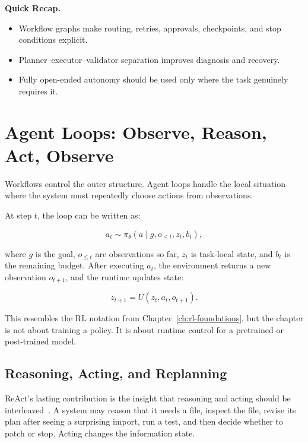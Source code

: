 \begin{quickrecap}
\textbf{Quick Recap.}
\begin{itemize}[nosep,leftmargin=1.5em]
  \item Workflow graphs make routing, retries, approvals, checkpoints, and stop conditions explicit.
  \item Planner--executor--validator separation improves diagnosis and recovery.
  \item Fully open-ended autonomy should be used only where the task genuinely requires it.
\end{itemize}
\end{quickrecap}


\section{Agent Loops: Observe, Reason, Act, Observe}
\label{sec:ch21-agent-loops}

Workflows control the outer structure. Agent loops handle the local situation where the system must repeatedly choose actions from observations.

At step $t$, the loop can be written as:

\[
a_t \sim \pi_\theta(a \mid g, o_{\leq t}, z_t, b_t),
\]

where $g$ is the goal, $o_{\leq t}$ are observations so far, $z_t$ is task-local state, and $b_t$ is the remaining budget. After executing $a_t$, the environment returns a new observation $o_{t+1}$, and the runtime updates state:

\[
z_{t+1} = U(z_t, a_t, o_{t+1}).
\]

This resembles the RL notation from Chapter~\ref{ch:rl-foundations}, but the chapter is not about training a policy. It is about runtime control for a pretrained or post-trained model.

\subsection{Reasoning, Acting, and Replanning}

ReAct's lasting contribution is the insight that reasoning and acting should be interleaved~\cite{yao2023react}. A system may reason that it needs a file, inspect the file, revise its plan after seeing a surprising import, run a test, and then decide whether to patch or stop. Acting changes the information state.

